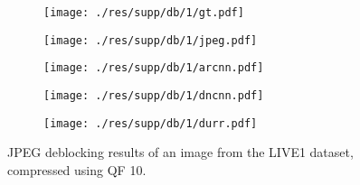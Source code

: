 \documentclass{article} %
\begin{document}
\begin{figure}[htp!]
	\centering
	\begin{subfigure}[t]{0.25\textwidth}
		\centering
		\texttt{[image: ./res/supp/db/1/gt.pdf]}
	\end{subfigure}
	\begin{subfigure}[t]{0.25\textwidth}
		\centering
		\texttt{[image: ./res/supp/db/1/jpeg.pdf]}
	\end{subfigure}
	\begin{subfigure}[t]{0.25\textwidth}
		\centering
		\texttt{[image: ./res/supp/db/1/arcnn.pdf]}
	\end{subfigure}

	\begin{subfigure}[t]{0.25\textwidth}
		\centering
		\texttt{[image: ./res/supp/db/1/dncnn.pdf]}
	\end{subfigure}
	\begin{subfigure}[t]{0.25\textwidth}
		\centering
		\texttt{[image: ./res/supp/db/1/durr.pdf]}
	\end{subfigure}
	\caption{JPEG deblocking results of an image from the LIVE1 dataset,
		compressed using QF 10.}
	\label{jpegres}
\end{figure}
\end{document}
